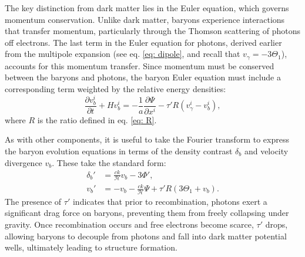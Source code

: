 \documentclass{aa}
\numberwithin{equation}{section}
\numberwithin{table}{section}
\numberwithin{figure}{section}
\begin{document}
The key distinction from dark matter lies in the Euler equation, which governs momentum conservation. Unlike dark matter, baryons experience interactions that transfer momentum, particularly through the Thomson scattering of photons off electrons. 
The last term in the Euler equation for photons, derived earlier from the multipole expansion (see eq. \eqref{eq: dipole}, and recall that $v_\gamma=-3\Theta_1$), accounts for this momentum transfer.
Since momentum must be conserved between the baryons and photons, the baryon Euler equation must include a corresponding term weighted by the relative energy densities:
\begin{equation}
    \frac{\partial v_b^i}{\partial t} + H v_b^i = -\frac{1}{a} \frac{\partial \Psi}{\partial x^i} - \tau' R(v_\gamma^i - v_b^i),
\end{equation}
where $R$ is the ratio defined in eq. \eqref{eq: R}.

As with other components, it is useful to take the Fourier transform to express the baryon evolution equations in terms of the density contrast $\delta_b$ and velocity divergence $v_b$. These take the standard form:
\begin{align}
    \delta_b' &= \frac{c k}{\mathcal{H}} v_b - 3\Phi', \\
    v_b' &= - v_b - \frac{c k}{\mathcal{H}} \Psi + \tau' R (3\Theta_1 + v_b).
\end{align}
The presence of $\tau'$ indicates that prior to recombination, photons exert a significant drag force on baryons, preventing them from freely collapsing under gravity. Once recombination occurs and free electrons become scarce, $\tau'$ drops, allowing baryons to decouple from photons and fall into dark matter potential wells, ultimately leading to structure formation. 
\end{document}
